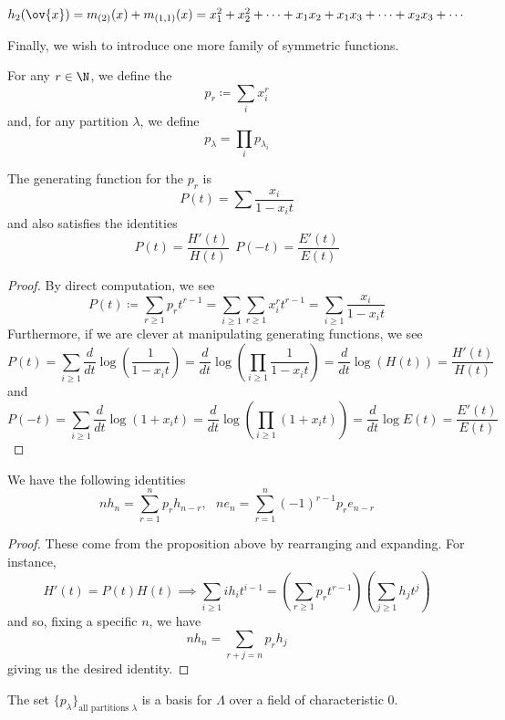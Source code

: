 \documentclass[11pt,leqno,oneside]{amsart}
\numberwithin{thm}{section}
\newcommand{\defeq}{\coloneqq}
\newcommand{\sym}{\Lambda}
\begin{document}
\begin{example}
  \(h_2(\ov{x}) = m_{(2)}(x) + m_{(1,1)}(x) = x_1^2 + x_2^2 + \cdots + x_1 x_2 + x_1 x_3 + \cdots
  + x_2 x_3 + \cdots\)
\end{example}
Finally, we wish to introduce one more family of symmetric functions.
\begin{defn}
  For any \(r \in \N\), we define the  \[
    p_r \defeq \sum_i x_i^r
  \]
  and, for any partition \(\lambda\), we define \[
    p_\lambda = \prod_i p_{\lambda_i}
  \]
\end{defn}
\begin{prop}
  The generating function for the \(p_r\) is \[
    P(t) = \sum \frac{x_i}{1-x_i t}
  \]
  and also satisfies the identities \[
    P(t) = \frac{H'(t)}{H(t)} \ \ P(-t) = \frac{E'(t)}{E(t)}
  \]
\end{prop}
\begin{proof}
  By direct computation, we see \[
    P(t) \defeq \sum_{r \geq 1} p_r t^{r-1} = \sum_{i \geq 1} \sum_{r
      \geq 1} x_i^r t^{r-1} = \sum_{i \geq 1} \frac{x_i}{1-x_i t}
  \]
  Furthermore, if we are clever at manipulating generating functions,
  we see \[
    P(t) = \sum_{i \geq 1} \frac{d}{dt} \log\left( \frac{1}{1-x_i t}
    \right) = \frac{d}{dt} \log\left( \prod_{i \geq 1} \frac{1}{1-x_i
        t}\right) = \frac{d}{dt} \log(H(t)) = \frac{H'(t)}{H(t)}
  \]
  and \[
    P(-t) = \sum_{i \geq 1} \frac{d}{dt} \log(1+x_i t) =
    \frac{d}{dt}\log\left( \prod_{i \geq 1}(1+x_i t) \right) =
    \frac{d}{dt}\log E(t) = \frac{E'(t)}{E(t)}
  \]
\end{proof}
\begin{cor}
  We have the following identities \[
    nh_n = \sum_{r=1}^n p_r h_{n-r}, \ \ \ n e_n = \sum_{r=1}^n
    (-1)^{r-1}p_r e_{n-r}
  \]
\end{cor}
\begin{proof}
  These come from the proposition above by rearranging and
  expanding. For instance, \[
    H'(t) = P(t)H(t) \implies \sum_{i \geq 1} ih_i t^{i-1} = \left(
      \sum_{r \geq 1} p_r t^{r-1} \right)\left( \sum_{j \geq 1} h_j t^j \right)
  \]
  and so, fixing a specific \(n\), we have \[
    nh_n = \sum_{r+j=n} p_r h_j
  \]
  giving us the desired identity.
\end{proof}
\begin{thm}
  The set \(\{p_\lambda\}_{\text{all partitions }\lambda}\) is a basis
  for \(\sym\) over a field of characteristic \(0\).
\end{thm}
\end{document}
